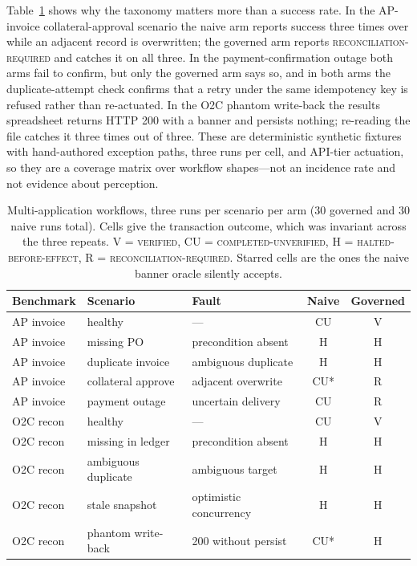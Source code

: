 Table~\ref{tab:multiapp} shows why the taxonomy matters more than a success
rate. In the AP-invoice collateral-approval scenario the naive arm reports
success three times over while an adjacent record is overwritten; the governed
arm reports \textsc{reconciliation-required} and catches it on all three. In the
payment-confirmation outage both arms fail to confirm, but only the governed arm
says so, and in both arms the duplicate-attempt check confirms that a retry
under the same idempotency key is refused rather than re-actuated. In the O2C
phantom write-back the results spreadsheet returns HTTP 200 with a banner and
persists nothing; re-reading the file catches it three times out of three. These
are deterministic synthetic fixtures with hand-authored exception paths, three
runs per cell, and API-tier actuation, so they are a coverage matrix over
workflow shapes---not an incidence rate and not evidence about perception.

\begin{table}[t]
\centering
\caption{Multi-application workflows, three runs per scenario per arm
(30 governed and 30 naive runs total). Cells give the transaction outcome, which
was invariant across the three repeats. V = \textsc{verified},
CU = \textsc{completed-unverified}, H = \textsc{halted-before-effect},
R = \textsc{reconciliation-required}. Starred cells are the ones the naive
banner oracle silently accepts.}
\label{tab:multiapp}
\small
\begin{tabular}{lllcc}
\toprule
Benchmark & Scenario & Fault & Naive & Governed \\
\midrule
AP invoice & healthy               & ---                  & CU  & V \\
AP invoice & missing PO            & precondition absent  & H   & H \\
AP invoice & duplicate invoice     & ambiguous duplicate  & H   & H \\
AP invoice & collateral approve    & adjacent overwrite   & CU* & R \\
AP invoice & payment outage        & uncertain delivery   & CU  & R \\
O2C recon  & healthy               & ---                  & CU  & V \\
O2C recon  & missing in ledger     & precondition absent  & H   & H \\
O2C recon  & ambiguous duplicate   & ambiguous target     & H   & H \\
O2C recon  & stale snapshot        & optimistic concurrency & H & H \\
O2C recon  & phantom write-back    & 200 without persist  & CU* & H \\
\bottomrule
\end{tabular}
\end{table}

